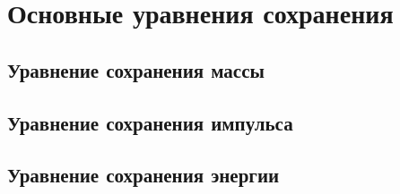
\section{Основные уравнения сохранения}
\label{sec:section2}

\subsection{Уравнение сохранения массы}	


\subsection{Уравнение сохранения импульса}


\subsection{Уравнение сохранения энергии}

\newpage